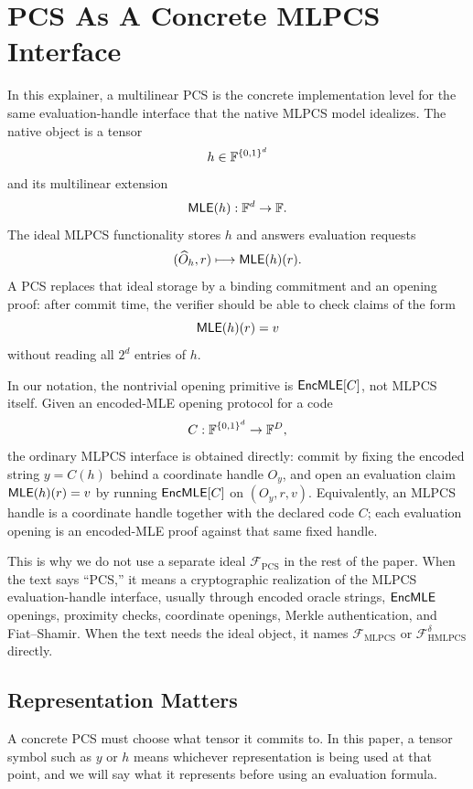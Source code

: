 \section{PCS As A Concrete MLPCS Interface}

In this explainer, a multilinear PCS is the concrete implementation level for
the same evaluation-handle interface that the native MLPCS model idealizes.
The native object is a tensor
\[
  h\in\mathbb{F}^{\{0,1\}^d}
\]
and its multilinear extension
\[
  \mathsf{MLE}(h):\mathbb{F}^d\to\mathbb{F}.
\]
The ideal MLPCS functionality stores \(h\) and answers evaluation requests
\[
  (\widehat O_h,r)\longmapsto \mathsf{MLE}(h)(r).
\]
A PCS replaces that ideal storage by a binding commitment and an opening proof:
after commit time, the verifier should be able to check claims of the form
\[
  \mathsf{MLE}(h)(r)=v
\]
without reading all \(2^d\) entries of \(h\).

In our notation, the nontrivial opening primitive is \(\mathsf{EncMLE}[C]\), not
MLPCS itself.  Given an encoded-MLE opening protocol for a code
\[
  C:\mathbb{F}^{\{0,1\}^d}\to\mathbb{F}^{D},
\]
the ordinary MLPCS interface is obtained directly:
commit by fixing the encoded string \(y=C(h)\) behind a coordinate handle
\(O_y\), and open an evaluation claim \(\mathsf{MLE}(h)(r)=v\) by running
\(\mathsf{EncMLE}[C]\) on \((O_y,r,v)\).  Equivalently, an MLPCS handle is a
coordinate handle together with the declared code \(C\); each evaluation
opening is an encoded-MLE proof against that same fixed handle.

This is why we do not use a separate ideal \(\mathcal F_{\mathrm{PCS}}\) in the
rest of the paper.  When the text says ``PCS,'' it means a cryptographic
realization of the MLPCS evaluation-handle interface, usually through encoded
oracle strings, \(\mathsf{EncMLE}\) openings, proximity checks, coordinate openings,
Merkle authentication, and Fiat--Shamir.  When the text needs the ideal object,
it names
\(\mathcal F_{\mathrm{MLPCS}}\) or \(\mathcal F_{\mathrm{HMLPCS}}^\delta\)
directly.

\subsection{Representation Matters}

A concrete PCS must choose what tensor it commits to.  In this paper, a tensor
symbol such as \(y\) or \(h\) means whichever representation is being used at
that point, and we will say what it represents before using an evaluation
formula.


